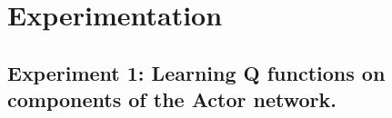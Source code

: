 \section{Experimentation}
\subsection{Experiment 1: Learning Q functions on components of the Actor network.}
